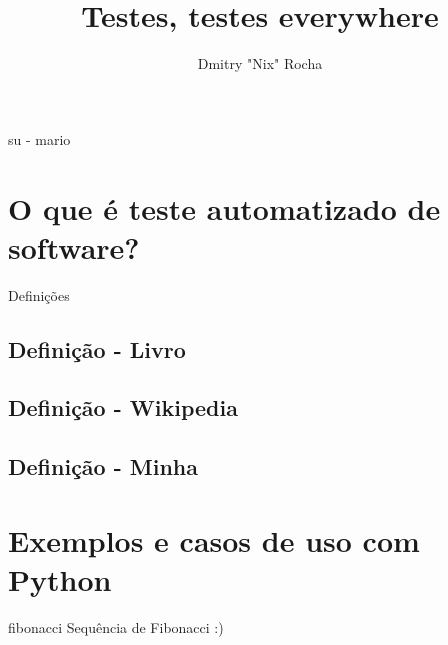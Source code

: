 \documentclass[]{beamer}
\author{Dmitry "Nix" Rocha}
\title{Testes, testes everywhere}
\institute{ /(guru|pug-)pi/i }
\begin{document}
  \begin{frame}{}
    \titlepage
  \end{frame}

  \begin{frame}{su - mario}
    \tableofcontents
  \end{frame}

  \section{O que é teste automatizado de software?}

  \begin{frame}
    \begin{center}
      \Huge Definições
    \end{center}
  \end{frame}

  \subsection*{Definição - Livro}\label{def1}
  

  \subsection*{Definição - Wikipedia}
  

  \subsection*{Definição - Minha}
  


  \backbgcolor
  \section{Exemplos e casos de uso com Python}

  \begin{frame}{fibonacci}
    Sequência de Fibonacci :)
  \end{frame}

  
  
\end{document}
